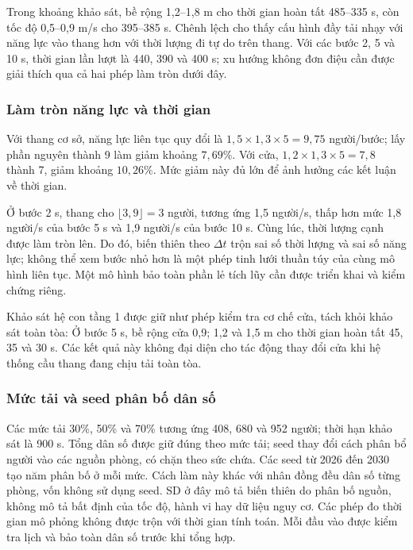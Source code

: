 Trong khoảng khảo sát, bề rộng 1,2--1,8 m cho thời gian hoàn tất 485--335 s, còn tốc độ 0,5--0,9 m/s cho 395--385 s. Chênh lệch cho thấy cấu hình đầy tải nhạy với năng lực vào thang hơn với thời lượng đi tự do trên thang. Với các bước 2, 5 và 10 s, thời gian lần lượt là 440, 390 và 400 s; xu hướng không đơn điệu cần được giải thích qua cả hai phép làm tròn dưới đây.

\subsubsection{Làm tròn năng lực và thời gian}
Với thang cơ sở, năng lực liên tục quy đổi là $1{,}5\times1{,}3\times5=9{,}75$ người/bước; lấy phần nguyên thành 9 làm giảm khoảng $7{,}69\%$. Với cửa, $1{,}2\times1{,}3\times5=7{,}8$ thành 7, giảm khoảng $10{,}26\%$. Mức giảm này đủ lớn để ảnh hưởng các kết luận về thời gian.

Ở bước 2 s, thang cho $\lfloor3{,}9\rfloor=3$ người, tương ứng 1,5 người/s, thấp hơn mức 1,8 người/s của bước 5 s và 1,9 người/s của bước 10 s. Cùng lúc, thời lượng cạnh được làm tròn lên. Do đó, biến thiên theo $\Delta t$ trộn sai số thời lượng và sai số năng lực; không thể xem bước nhỏ hơn là một phép tinh lưới thuần túy của cùng mô hình liên tục. Một mô hình bảo toàn phần lẻ tích lũy cần được triển khai và kiểm chứng riêng.

Khảo sát hệ con tầng 1 được giữ như phép kiểm tra cơ chế cửa, tách khỏi khảo sát toàn tòa:
Ở bước 5 s, bề rộng cửa 0,9; 1,2 và 1,5 m cho thời gian hoàn tất 45, 35 và 30 s. Các kết quả này không đại diện cho tác động thay đổi cửa khi hệ thống cầu thang đang chịu tải toàn tòa.

\subsubsection{Mức tải và seed phân bố dân số}
Các mức tải 30\%, 50\% và 70\% tương ứng 408, 680 và 952 người; thời hạn khảo sát là 900 s. Tổng dân số được giữ đúng theo mức tải; seed thay đổi cách phân bổ người vào các nguồn phòng, có chặn theo sức chứa. Các seed từ 2026 đến 2030 tạo năm phân bố ở mỗi mức. Cách làm này khác với nhân đồng đều dân số từng phòng, vốn không sử dụng seed.
SD ở đây mô tả biến thiên do phân bố nguồn, không mô tả bất định của tốc độ, hành vi hay dữ liệu nguy cơ. Các phép đo thời gian mô phỏng không được trộn với thời gian tính toán. Mỗi đầu vào được kiểm tra lịch và bảo toàn dân số trước khi tổng hợp.

